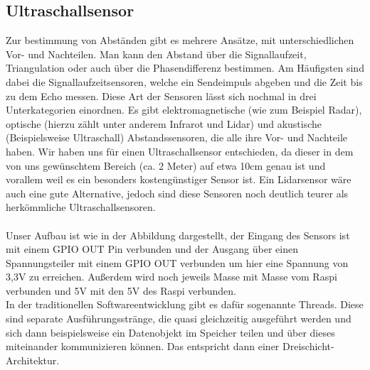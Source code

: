 \subsection{Ultraschallsensor}
Zur bestimmung von Abständen gibt es mehrere Ansätze, mit unterschiedlichen Vor- und Nachteilen. Man kann den Abstand über die Signallaufzeit, Triangulation oder auch über die Phasendifferenz bestimmen. Am Häufigsten sind dabei die Signallaufzeitsensoren, welche ein Sendeimpuls abgeben und die Zeit bis zu dem Echo messen. Diese Art der Sensoren lässt sich nochmal in drei Unterkategorien einordnen. Es gibt elektromagnetische (wie zum Beispiel Radar), optische (hierzu zählt unter anderem Infrarot und Lidar) und akustische (Beispielsweise Ultraschall) Abstandssensoren, die alle ihre Vor- und Nachteile haben. Wir haben uns für einen Ultraschallsensor entschieden, da dieser in dem von uns gewünschtem Bereich (ca. 2 Meter) auf etwa 10cm genau ist und vorallem weil es ein besonders kostengünstiger Sensor ist. Ein Lidarsensor wäre auch eine gute Alternative, jedoch sind diese Sensoren noch deutlich teurer als herkömmliche Ultraschallsensoren.
\\
\\
Unser Aufbau ist wie in der Abbildung dargestellt, der Eingang des Sensors ist mit einem GPIO OUT Pin verbunden und der Ausgang über einen Spannungsteiler mit einem GPIO OUT verbunden um hier eine Spannung von 3,3V zu erreichen. Außerdem wird noch jeweils Masse mit Masse vom Raspi verbunden und 5V mit den 5V des Raspi verbunden.
\\
In der traditionellen Softwareentwicklung gibt es dafür sogenannte Threads. Diese sind separate Ausführungsstränge, die quasi gleichzeitig ausgeführt werden und sich dann beispielsweise ein Datenobjekt im Speicher teilen und über dieses miteinander kommunizieren können. Das entspricht dann einer Dreischicht-Architektur.
